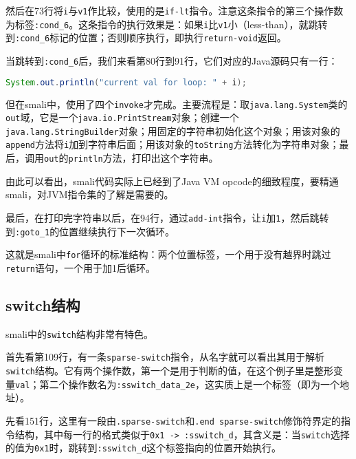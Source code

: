 然后在73行将\lstinline!i!与\lstinline!v1!作比较，使用的是\lstinline!if-lt!指令。注意这条指令的第三个操作数为标签\lstinline!:cond_6!。这条指令的执行效果是：如果\lstinline!i!比\lstinline!v1!小（less-than），就跳转到\lstinline!:cond_6!标记的位置；否则顺序执行，即执行\lstinline!return-void!返回。

当跳转到\lstinline!:cond_6!后，我们来看第80行到91行，它们对应的Java源码只有一行：
\begin{lstlisting}[language=java, numbers=none]
System.out.println("current val for loop: " + i);
\end{lstlisting}
但在smali中，使用了四个\lstinline!invoke!才完成。主要流程是：取\lstinline!java.lang.System!类的\lstinline!out!域，它是一个\lstinline!java.io.PrintStream!对象；创建一个\lstinline!java.lang.StringBuilder!对象；用固定的字符串初始化这个对象；用该对象的\lstinline!append!方法将\lstinline!i!加到字符串后面；用该对象的\lstinline!toString!方法转化为字符串对象；最后，调用\lstinline!out!的\lstinline!println!方法，打印出这个字符串。

由此可以看出，smali代码实际上已经到了Java VM opcode的细致程度，要精通smali，对JVM指令集的了解是需要的。

最后，在打印完字符串以后，在94行，通过\lstinline!add-int!指令，让\lstinline!i!加\lstinline!1!，然后跳转到\lstinline!:goto_1!的位置继续执行下一次循环。

这就是smali中\lstinline!for!循环的标准结构：两个位置标签，一个用于没有越界时跳过\lstinline!return!语句，一个用于加1后循环。

\subsection{switch结构}
\label{SubSec:dalvik-smali-switch}




smali中的\lstinline!switch!结构非常有特色。

首先看第109行，有一条\lstinline!sparse-switch!指令，从名字就可以看出其用于解析\lstinline!switch!结构。它有两个操作数，第一个是用于判断的值，在这个例子里是整形变量\lstinline!val!；第二个操作数名为\lstinline!:sswitch_data_2e!，这实质上是一个标签（即为一个地址）。

先看151行，这里有一段由\lstinline!.sparse-switch!和\lstinline!.end sparse-switch!修饰符界定的指令结构，其中每一行的格式类似于\lstinline!0x1 -> :sswitch_d!，其含义是：当\lstinline!switch!选择的值为\lstinline!0x1!时，跳转到\lstinline!:sswitch_d!这个标签指向的位置开始执行。

